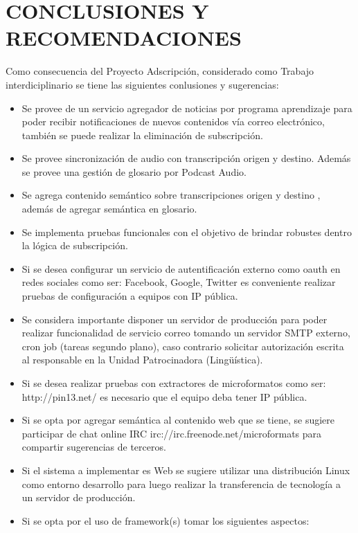 \chapter{CONCLUSIONES Y RECOMENDACIONES}

Como consecuencia del Proyecto Adscripci\'{o}n, considerado como Trabajo 
interdiciplinario se tiene las siguientes conlusiones y sugerencias:

\begin{itemize}

\item Se provee de un servicio agregador de noticias por programa aprendizaje
para poder recibir notificaciones de nuevos contenidos v\'{i}a correo 
electr\'{o}nico, tambi\'{e}n se puede realizar la eliminaci\'{o}n de 
subscripci\'{o}n.   
\item Se provee sincronizaci\'{o}n de audio con transcripci\'{o}n origen y 
destino. Adem\'{a}s se provee una gesti\'{o}n de glosario por Podcast Audio. 
\item Se agrega contenido sem\'{a}ntico sobre transcripciones origen y destino
, adem\'{a}s de agregar sem\'{a}ntica en glosario.
\item Se implementa pruebas funcionales con el objetivo de brindar robustes dentro
la l\'{o}gica de subscripci\'{o}n.
\item Si se desea configurar un servicio de autentificaci\'{o}n externo como 
oauth en redes sociales como ser: Facebook, Google, Twitter es conveniente 
realizar pruebas de configuraci\'{o}n a equipos con IP p\'{u}blica.
\item Se considera importante disponer un servidor de producci\'{o}n para poder 
realizar funcionalidad de servicio correo tomando un servidor SMTP externo,
cron job (tareas segundo plano), caso contrario solicitar autorizaci\'{o}n 
escrita al responsable en la Unidad Patrocinadora (Ling\"{u}\'{i}stica).
\item Si se desea realizar pruebas con extractores de microformatos como ser:
http://pin13.net/ es necesario que el equipo deba tener IP p\'{u}blica.
\item Si se opta por agregar sem\'{a}ntica al contenido web que se tiene, se 
sugiere participar de chat online IRC irc://irc.freenode.net/microformats para
compartir sugerencias de terceros.
\item Si el sistema a implementar es Web se sugiere utilizar una distribuci\'{o}n
Linux como entorno desarrollo para luego realizar la transferencia de 
tecnolog\'{i}a a un servidor de producci\'{o}n.
\item Si se opta por el uso de framework(s) tomar los siguientes aspectos: 

\end{itemize}
